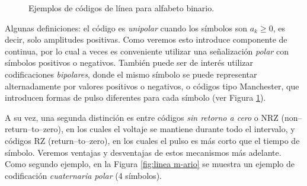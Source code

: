 \begin{figure}
\begin{center}
        \caption{Ejemplos de códigos de línea para alfabeto binario.}\label{fig:codlin}
    \end{center}
\end{figure}

Algunas definiciones: el código es \emph{unipolar} cuando los símbolos son $a_k\geqslant 0$, es decir, solo amplitudes positivas. Como veremos esto introduce componente de continua, por lo cual a veces es conveniente utilizar una señalización \emph{polar} con símbolos positivos o negativos. También puede ser de interés utilizar codificaciones \emph{bipolares}, donde el mismo símbolo se puede representar alternadamente por valores positivos o negativos, o códigos tipo Manchester, que introducen formas de pulso diferentes para cada símbolo (ver Figura \ref{fig:codlin}).

A su vez, una segunda distinción es entre códigos \emph{sin retorno a cero} o NRZ (non--return--to--zero), en los cuales el voltaje se mantiene durante todo el intervalo, y códigos RZ (return--to--zero), en los cuales el pulso es más corto que el tiempo de símbolo. Veremos ventajas y desventajas de estos mecanismos más adelante. Como segundo ejemplo, en la Figura \ref{fig:linea m-ario} se muestra un ejemplo de codificación \emph{cuaternaria polar} (4 símbolos).

